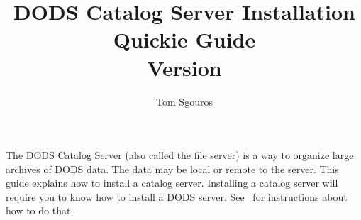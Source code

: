 \documentclass{dods-book2}
\newcommand{\DOCversion}{Version \rcsInfoRevision}
\begin{document}
\title{DODS Catalog Server Installation Quickie Guide\\\DOCversion}
\author{Tom Sgouros}
\maketitle

\copyrightmatter

\tableofcontents
\clearemptydoublepage



\begin{ifhtml}
  
  The DODS Catalog Server (also called the file server) is a way to
  organize large archives of DODS data.  The data may be local or
  remote to the server.  This guide explains how to install a catalog
  server.  Installing a catalog server will require you to know how to
  install a DODS server.  See \DODSinstall\ for instructions about how
  to do that.

\end{ifhtml}



\end{document}
